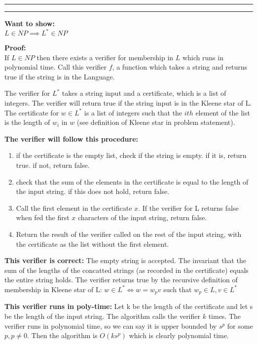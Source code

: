 \documentclass[11pt]{article}
\newcounter{questionCounter}
\newcounter{partCounter}[questionCounter]
\newenvironment{question}[2][\arabic{questionCounter}]{%
    \setcounter{partCounter}{0}%
    \vspace{.25in} \hrule \vspace{0.5em}%
        \noindent{\bf #2}%
    \vspace{0.8em} \hrule \vspace{.10in}%
    \addtocounter{questionCounter}{1}%
}{}
\begin{document}
\begin{question}{When You Know L's In $\mathbf{NP}$}
\textbf{Want to show:}\\
    $L \in NP \implies L^{*} \in NP$
    
\textbf{Proof:}\\
    If $L \in NP$ then there exists a verifier for membership in $L$ which runs
    in polynomial time. Call this verifier $f$, a function which takes a string
    and returns true if the string is in the Language.
    
    The verifier for $L^{*}$ takes a string input and a certificate, which is a list of integers.
    The verifier will return true if the string input is in the Kleene star of L.
    The certificate for $w \in L^{*}$ is a list of integers such that the $i{th}$ element
    of the list is the length of $w_i$ in $w$ (see definition of Kleene star in problem 
    statement).

    \textbf{The verifier will follow this procedure:}
    \begin{enumerate}
        \item if the certificate is the empty list, check if the string is empty.
            if it is, return true. if not, return false.
        \item check that the sum of the elements in the certificate is equal to the
        length of the input string. if this does not hold, return false.
        \item Call the first element in the certificate $x$. If the verifier 
        for L returns false when fed the first $x$ characters of the input string,
        return false.
        \item Return the result of the verifier called on the rest of the input string,
        with the certificate as the list without the first element.
    \end{enumerate}
    
    \textbf{This verifier is correct:}
        The empty string is accepted.
        The invariant that the sum of the lengths of the concatted strings 
            (as recorded in the certificate) equals the entire string holds.
        The verifier returns true by the recursive definition of membership in 
            Kleene star of L: $w \in L^{*} \iff w = w_pv$ such that $w_p\in L, v\in L^{*}$
    
    \textbf{This verifier runs in poly-time:}
        Let k be the length of the certificate and let s be the length of the input string.
        The algorithm calls the verifier $k$ times. The verifier runs in polynomial
        time, so we can say it is upper bounded by $s^{p}$ for some $p, p\neq 0$.
        Then the algorithm is $O(ks^{p})$ which is clearly polynomial time.

\end{question}
\end{document}
